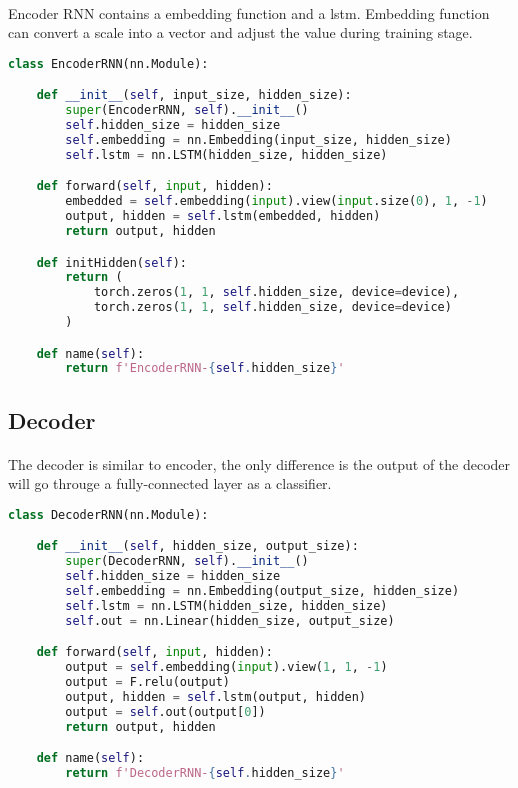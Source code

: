 \paragraph{}
Encoder RNN contains a embedding function and a lstm. Embedding function can convert a scale into a vector and adjust the value during training stage.
\begin{lstlisting}[language=Python]
class EncoderRNN(nn.Module):

    def __init__(self, input_size, hidden_size):
        super(EncoderRNN, self).__init__()
        self.hidden_size = hidden_size
        self.embedding = nn.Embedding(input_size, hidden_size)
        self.lstm = nn.LSTM(hidden_size, hidden_size)

    def forward(self, input, hidden):
        embedded = self.embedding(input).view(input.size(0), 1, -1)
        output, hidden = self.lstm(embedded, hidden)
        return output, hidden

    def initHidden(self):
        return (
            torch.zeros(1, 1, self.hidden_size, device=device),
            torch.zeros(1, 1, self.hidden_size, device=device)
        )

    def name(self):
        return f'EncoderRNN-{self.hidden_size}'
\end{lstlisting}
\subsection{Decoder}
\paragraph{}
The decoder is similar to encoder, the only difference is the output of the decoder will go througe a fully-connected layer as a classifier.
\begin{lstlisting}[language=Python]
class DecoderRNN(nn.Module):

    def __init__(self, hidden_size, output_size):
        super(DecoderRNN, self).__init__()
        self.hidden_size = hidden_size
        self.embedding = nn.Embedding(output_size, hidden_size)
        self.lstm = nn.LSTM(hidden_size, hidden_size)
        self.out = nn.Linear(hidden_size, output_size)

    def forward(self, input, hidden):
        output = self.embedding(input).view(1, 1, -1)
        output = F.relu(output)
        output, hidden = self.lstm(output, hidden)
        output = self.out(output[0])
        return output, hidden

    def name(self):
        return f'DecoderRNN-{self.hidden_size}'
\end{lstlisting}
